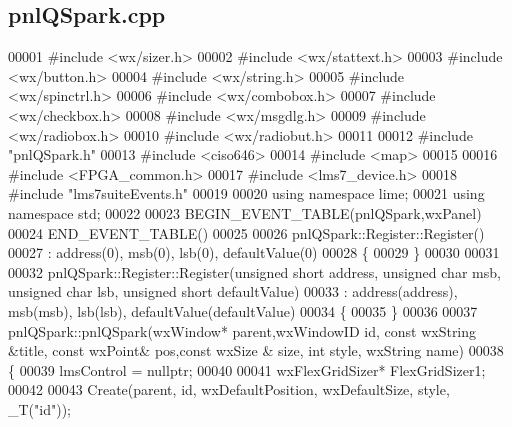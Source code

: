 \subsection{pnl\+Q\+Spark.\+cpp}
\label{pnlQSpark_8cpp_source}

\begin{DoxyCode}
00001 \textcolor{preprocessor}{#include <wx/sizer.h>}
00002 \textcolor{preprocessor}{#include <wx/stattext.h>}
00003 \textcolor{preprocessor}{#include <wx/button.h>}
00004 \textcolor{preprocessor}{#include <wx/string.h>}
00005 \textcolor{preprocessor}{#include <wx/spinctrl.h>}
00006 \textcolor{preprocessor}{#include <wx/combobox.h>}
00007 \textcolor{preprocessor}{#include <wx/checkbox.h>}
00008 \textcolor{preprocessor}{#include <wx/msgdlg.h>}
00009 \textcolor{preprocessor}{#include <wx/radiobox.h>}
00010 \textcolor{preprocessor}{#include <wx/radiobut.h>}
00011 
00012 \textcolor{preprocessor}{#include "pnlQSpark.h"}
00013 \textcolor{preprocessor}{#include <ciso646>}
00014 \textcolor{preprocessor}{#include <map>}
00015 
00016 \textcolor{preprocessor}{#include <FPGA_common.h>}
00017 \textcolor{preprocessor}{#include <lms7_device.h>}
00018 \textcolor{preprocessor}{#include "lms7suiteEvents.h"}
00019 
00020 \textcolor{keyword}{using namespace }lime;
00021 \textcolor{keyword}{using namespace }std;
00022 
00023 BEGIN\_EVENT\_TABLE(pnlQSpark,wxPanel)
00024 END\_EVENT\_TABLE()
00025 
00026 pnlQSpark::Register::Register()
00027     : address(0), msb(0), lsb(0), defaultValue(0)
00028 \{
00029 \}
00030 
00031 
00032 pnlQSpark::Register::Register(\textcolor{keywordtype}{unsigned} \textcolor{keywordtype}{short} address, \textcolor{keywordtype}{unsigned} \textcolor{keywordtype}{char} msb, \textcolor{keywordtype}{unsigned} \textcolor{keywordtype}{char} lsb, \textcolor{keywordtype}{unsigned} \textcolor{keywordtype}{short} 
      defaultValue)
00033     : address(address), msb(msb), lsb(lsb), defaultValue(defaultValue)
00034 \{
00035 \}
00036 
00037 pnlQSpark::pnlQSpark(wxWindow* parent,wxWindowID \textcolor{keywordtype}{id}, \textcolor{keyword}{const} wxString &title, \textcolor{keyword}{const} wxPoint& pos,\textcolor{keyword}{const} wxSize
      & size, \textcolor{keywordtype}{int} style, wxString name)
00038 \{
00039     lmsControl = \textcolor{keyword}{nullptr};
00040 
00041     wxFlexGridSizer* FlexGridSizer1;
00042 
00043     Create(parent, \textcolor{keywordtype}{id}, wxDefaultPosition, wxDefaultSize, style, _T(\textcolor{stringliteral}{"id"}));

\end{DoxyCode}
